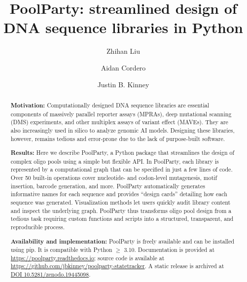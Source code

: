 \documentclass[twoside]{kinneylab_preprintstyle}
\begin{document}
\linenumbers
\raggedbottom
{}


\title{PoolParty: streamlined design of DNA sequence libraries in Python}

\author[1]{Zhihan Liu}
\author[1]{Aidan Cordero}
\author[1,\Letter]{Justin B. Kinney}


\begin{abstract}
\textbf{Motivation:}
Computationally designed DNA sequence libraries are essential components of massively parallel reporter assays (MPRAs), deep mutational scanning (DMS) experiments, and other multiplex assays of variant effect (MAVEs). They are also increasingly used in silico to analyze genomic AI models. Designing these libraries, however, remains tedious and error-prone due to the lack of purpose-built software.

\textbf{Results:}
Here we describe PoolParty, a Python package that streamlines the design of complex oligo pools using a simple but flexible API. In PoolParty, each library is represented by a computational graph that can be specified in just a few lines of code. Over 50 built-in operations cover nucleotide- and codon-level mutagenesis, motif insertion, barcode generation, and more. PoolParty automatically generates informative names for each sequence and provides ``design cards'' detailing how each sequence was generated. Visualization methods let users quickly audit library content and inspect the underlying graph. PoolParty thus transforms oligo pool design from a tedious task requiring custom functions and scripts into a structured, transparent, and reproducible process.

\textbf{Availability and implementation:}
PoolParty is freely available and can be installed using pip. It is compatible with Python $\geq$ 3.10. Documentation is provided at \url{https://poolparty.readthedocs.io}; source code is available at \url{https://github.com/jbkinney/poolparty-statetracker}. A static release is archived at \href{https://zenodo.org/records/19445098}{DOI 10.5281/zenodo.19445098}.
\end{abstract}
\end{document}
